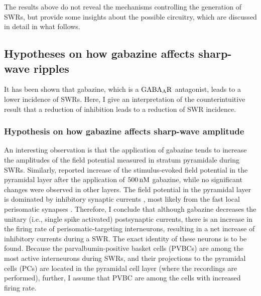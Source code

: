   The results above do not reveal the mechanisms controlling the generation of
  SWRs, but provide some insights about the possible circuitry, which are
  discussed in detail in what follows.
    
  \subsection{Hypotheses on how gabazine affects sharp-wave ripples} 
  \label{sec:disc_gabazine}
    It has been shown that gabazine, which is a $\rm GABA_AR$ antagonist, leads
    to a lower incidence of SWRs. Here, I give an interpretation of the
    counterintuitive result that a reduction of inhibition leads to a reduction
    of SWR incidence.

    \subsubsection{Hypothesis on how gabazine affects sharp-wave amplitude} 
      An interesting observation is that the application of gabazine tends to
      increase the amplitudes of the field potential measured in stratum
      pyramidale during SWRs. Similarly, \cite{Steidl2006} reported increase of
      the stimulus-evoked field potential in the pyramidal layer after the
      application of $500\,\rm nM$ gabazine, while no significant changes were
      observed in other layers. The field potential in the pyramidal layer is
      dominated by inhibitory synaptic currents \citep{Schonberger2014}, most
      likely from the fast local perisomatic synapses \citep{Ylinen1995}.
      Therefore, I conclude that although gabazine decreases the unitary (i.e.,
      single spike activated) postsynaptic currents, there is an increase in
      the firing rate of perisomatic-targeting interneurons, resulting in a net
      increase of inhibitory currents during a SWR. The exact identity of these
      neurons is to be found. Because the parvalbumin-positive basket cells
      (PVBCs) are among the most active interneurons during SWRs, and their
      projections to the pyramidal cells (PCs) are located in the pyramidal
      cell layer (where the recordings are performed), further, I assume that
      PVBC are among the cells with increased firing rate.

